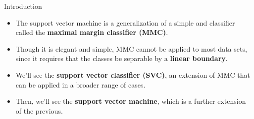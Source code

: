 \begin{frame}{Introduction}

\begin{itemize}
    \item The support vector machine is a generalization of a simple and classifier called the \textbf{maximal margin classifier (MMC)}. \pause
    
    \item Though it is elegant and simple, MMC cannot be applied to most data sets, since it requires that the classes be separable by a \textbf{linear boundary}. \pause
    
    \item We'll see the \textbf{support vector classifier (SVC)}, an extension of MMC that can be applied in a broader range of cases. \pause
    
    \item Then, we'll see the \textbf{support vector machine}, which is a further extension of the previous. \pause
\end{itemize}
    
\end{frame}

